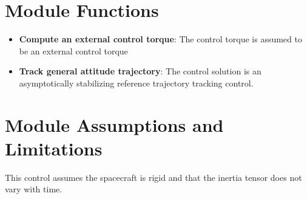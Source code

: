 

\section{Module Functions}
\begin{itemize}
	\item \textbf{Compute an external control torque}: The control torque is assumed to be an external control torque
	\item \textbf{Track general attitude trajectory}: The control solution is an asymptotically stabilizing reference trajectory tracking control.
\end{itemize}

\section{Module Assumptions and Limitations}
This control assumes the spacecraft is rigid and that the inertia tensor does not vary with time.